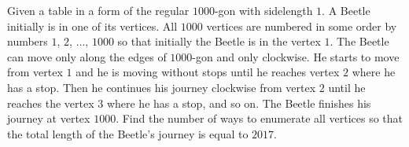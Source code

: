 Given a table in a form of the regular $1000$-gon with sidelength $1$. A Beetle initially is in one of its vertices. All $1000$ vertices are numbered in some order by numbers $1$, $2$, $\ldots$, $1000$ so that initially the Beetle is in the vertex $1$.  The  Beetle can move only along the edges of $1000$-gon and only clockwise. He starts to move from vertex $1$ and he is moving without stops until he reaches vertex $2$ where he has a stop. Then he continues his journey clockwise from vertex $2$ until he reaches the vertex $3$ where he has a stop, and so on. The Beetle finishes his journey at vertex $1000$. Find the number of ways to enumerate all vertices so that the total length of the Beetle's journey is equal to $2017$.